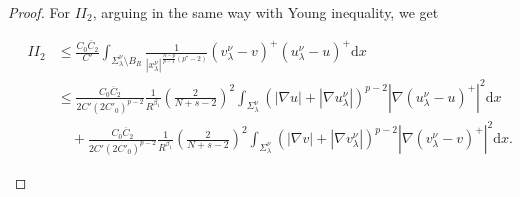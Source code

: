 \documentclass[12pt]{amsart}
\theoremstyle{definition}
\theoremstyle{remark}
\theoremstyle{conclusion}
\theoremstyle{conjecture}
\numberwithin{equation}{section}
\begin{document}
\begin{proof}
For $II_2$, arguing in the same way with Young inequality, we get
\begin{small}
\begin{align}\label{eq1007}
\quad II_2 &\leq \frac{C_0 \overline{C}_2}{C'} \int_{\Sigma_\lambda^\nu\setminus B_R}  \frac{1}{|x^\nu_\lambda|^{\frac{N-p}{p-1}(p^\star-2)}} (v^{\nu}_{\lambda}-v )^+(u^{\nu}_{\lambda}-u )^+ \mathrm{d}x \\
    &\leq \frac{ C_0\overline{C}_2}{2C'(2C'_0)^{p-2}} \frac{1}{R^{\beta_1}}
    \left(\frac{2}{N+s-2}\right)^2\int_{\Sigma_\lambda^\nu} (|\nabla u|+|\nabla u^{\nu}_{\lambda}|)^{p-2} |\nabla(u^{\nu}_{\lambda}-u )^+|^2 \mathrm{d}x \nonumber \\
    & \quad + \frac{ C_0\overline{C}_2}{2C'(2C'_0)^{p-2}} \frac{1}{R^{\beta_1}}
    \left(\frac{2}{N+s-2}\right)^2\int_{\Sigma_\lambda^\nu} (|\nabla v|+|\nabla v^{\nu}_{\lambda}|)^{p-2} |\nabla(v^{\nu}_{\lambda}-v )^+|^2 \mathrm{d}x. \nonumber
\end{align}\end{small}


\end{proof}
\end{document}
